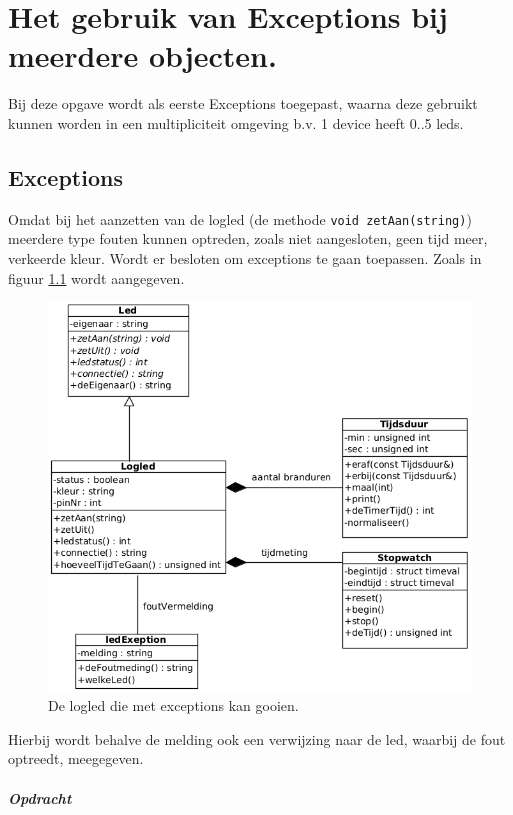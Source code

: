 \chapter{Het gebruik van Exceptions bij meerdere objecten.}

Bij deze opgave wordt als eerste Exceptions toegepast, waarna deze gebruikt kunnen worden in een multipliciteit omgeving b.v. 1 device heeft 0..5 leds.

\section{Exceptions} 
Omdat bij het aanzetten van de logled (de methode \texttt{void zetAan(string)}) meerdere type fouten kunnen optreden, zoals niet aangesloten, geen tijd meer, verkeerde kleur. Wordt er besloten om  exceptions te gaan toepassen. Zoals in figuur \ref{fig:llExc} wordt aangegeven.
\begin{figure}[h!]
	\captionsetup{justification=centering}
	\includegraphics[width=0.9 \linewidth]{figuren/llExcept}     
\centering
\caption{De logled die met exceptions kan gooien.}
\label{fig:llExc}
\end{figure} 
Hierbij wordt behalve de melding ook een verwijzing naar de led, waarbij de fout optreedt, meegegeven.
\newpage
\paragraph{Opdracht}

